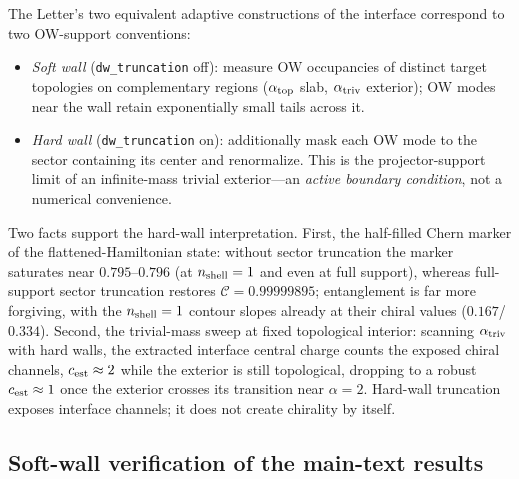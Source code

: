 \documentclass[aps,prl,onecolumn,superscriptaddress,nofootinbib]{revtex4-2}
\newcommand{\calC}{\mathcal{C}}
\newcommand{\nsh}{n_{\rm shell}}
\newcommand{\atopo}{\alpha_{\rm top}}
\newcommand{\atriv}{\alpha_{\rm triv}}
\begin{document}
The Letter's two equivalent adaptive constructions of the interface correspond to two OW-support conventions:
\begin{itemize}
\item \emph{Soft wall} (\texttt{dw\_truncation} off): measure OW occupancies of distinct target topologies on complementary regions ($\atopo$ slab, $\atriv$ exterior); OW modes near the wall retain exponentially small tails across it.
\item \emph{Hard wall} (\texttt{dw\_truncation} on): additionally mask each OW mode to the sector containing its center and renormalize.  This is the projector-support limit of an infinite-mass trivial exterior---an \emph{active boundary condition}, not a numerical convenience.
\end{itemize}
Two facts support the hard-wall interpretation.  First, the half-filled Chern marker of the flattened-Hamiltonian state: without sector truncation the marker saturates near $0.795$--$0.796$ (at $\nsh=1$ and even at full support), whereas full-support sector truncation restores $\calC=0.99999895$; entanglement is far more forgiving, with the $\nsh=1$ contour slopes already at their chiral values ($0.167$/$0.334$).  Second, the trivial-mass sweep at fixed topological interior: scanning $\atriv$ with hard walls, the extracted interface central charge counts the exposed chiral channels, $c_{\rm est}\approx2$ while the exterior is still topological, dropping to a robust $c_{\rm est}\approx1$ once the exterior crosses its transition near $\alpha=2$.  Hard-wall truncation exposes interface channels; it does not create chirality by itself.

\subsection{Soft-wall verification of the main-text results}
\label{sm:dwtrunc0}
\end{document}
